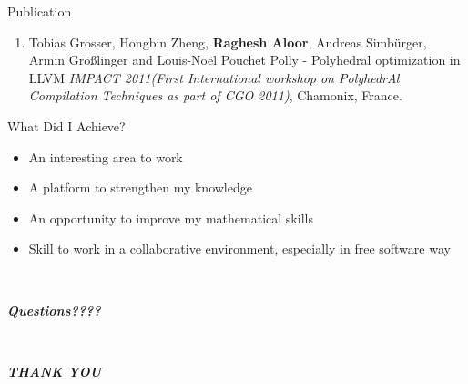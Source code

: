 \documentclass{beamer}
\begin{document}
\begin{frame}{Publication}
\vspace{-0.3cm}

\begin{enumerate}
\item Tobias Grosser, Hongbin Zheng, \textbf{Raghesh Aloor}, Andreas Simb{\"u}rger, Armin {G}r{\"o}{\ss}linger and Louis-No{\"e}l Pouchet 
  Polly - Polyhedral optimization in LLVM {\em
  IMPACT 2011(First International workshop on PolyhedrAl Compilation Techniques as part of CGO 2011)}, Chamonix, France.
\end{enumerate}

\end{frame}


\begin{frame}{What Did I Achieve?}
\begin{itemize}
\item An interesting area to work
\item A platform to strengthen my knowledge
\item An opportunity to improve my mathematical skills
\item Skill to work in a collaborative environment, especially in free software way
\end{itemize}
\end{frame}

\begin{frame}{\ }
\begin{center} \textbf{\emph{Questions????}} \end{center}
\end{frame}

\begin{frame}{\ }
\begin{center} \textbf{\emph{THANK YOU}} \end{center}
\end{frame}
\end{document}

